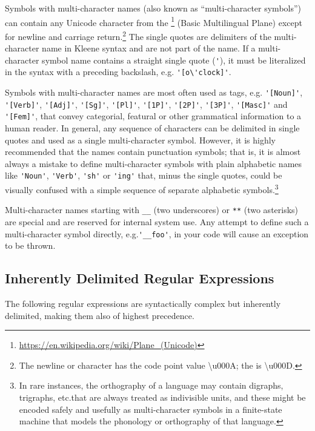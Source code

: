 \vspace{.5cm}

\noindent
Symbols with multi-character names (also known as ``multi-character symbols'') can contain any
Unicode character from the
\footnote{\url{https://en.wikipedia.org/wiki/Plane_(Unicode)}} (Basic Multilingual Plane) except for newline and
carriage return.\footnote{The newline or  character has the code
point value \textbackslash{}u000A; the  is \textbackslash{}u000D.}  The
single quotes are delimiters of the multi-character 
name in Kleene syntax and are not part of the name.  If a
multi-character symbol name contains a straight single quote
(\verb!'!), it must be literalized in the syntax with a preceding backslash, e.g.\@
\verb!'[o\'clock]'!.

Symbols with multi-character names are most often used as tags, e.g.\@
\verb!'[Noun]'!, \verb!'[Verb]'!, \verb!'[Adj]'!, \verb!'[Sg]'!,
\verb!'[Pl]'!, \verb!'[1P]'!, \verb!'[2P]'!, \verb!'[3P]'!,
\verb!'[Masc]'! and \verb!'[Fem]'!, that convey categorial,
featural or other grammatical information to a human reader.  In general, any sequence of
 characters can be delimited in single quotes and used as a
single multi-character symbol.  However, it is highly recommended that
the names contain punctuation symbols; that is, it is almost always a
mistake to define multi-character symbols with plain alphabetic names
like \verb!'Noun'!, \verb!'Verb'!, \verb!'sh'! or \verb!'ing'! that, 
minus the single quotes, could be visually confused with a simple
sequence of separate alphabetic symbols.\footnote{In rare instances, the
orthography of a language may contain digraphs, trigraphs, etc.\@ that
are always treated as indivisible units, and these might be encoded
safely and usefully as multi-character symbols in a finite-state machine
that models the phonology or orthography of that language.}

Multi-character names starting with \verb!__! (two underscores) or
\verb!**! (two asterisks) are special and are reserved for internal
system use.  Any attempt to define such a multi-character symbol
directly, e.g.\@ \verb!'__foo'!, in your code will cause an exception to be
thrown.

\subsection{Inherently Delimited Regular Expressions}

The following regular expressions are syntactically complex but
inherently delimited, making them also of highest precedence.


